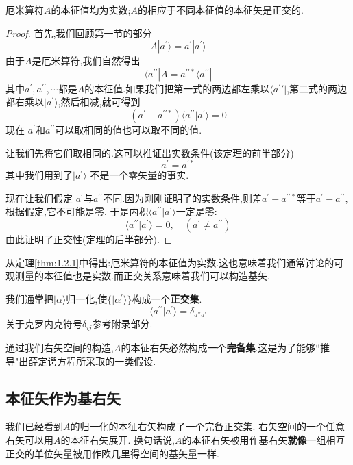 \documentclass[lang=cn,newtx,10pt,scheme=chinese,thmcnt=section]{elegantbook}
\begin{document}
\begin{theorem}\label{thm:1.2.1}
	厄米算符$A$的本征值均为实数;$A$的相应于不同本征值的本征矢是正交的.
\end{theorem}
\begin{proof}
	首先,我们回顾第一节的部分
	$$
	A|a^{\prime}\rangle=a^{\prime}| a^{\prime}\rangle
	$$
	由于$A$是厄米算符,我们自然得出
	$$
		\langle a^{\prime\prime}|A=a^{\prime\prime*}\langle a^{\prime\prime}|
	$$
	其中$a^\prime,a^{\prime\prime},\cdots$都是$A$的本征值.如果我们把第一式的两边都左乘以$\langle a^\prime\prime|$,第二式的两边都右乘以$|a^\prime\rangle$,然后相减,就可得到
	$$(a^{\prime}-a^{\prime\prime*})\langle a^{\prime\prime}|a^{\prime}\rangle=0$$
	现在 $a^{\prime}$和$a^{\prime\prime}$可以取相同的值也可以取不同的值.
	
	让我们先将它们取相同的.这可以推证出实数条件(该定理的前半部分)
	$$a^{\prime}=a^{\prime*}$$
	其中我们用到了$|a^\prime\rangle$ 不是一个零矢量的事实. 
	
	现在让我们假定 $a^\prime$与$a^{\prime\prime}$不同.因为刚刚证明了的实数条件,则差$a^{\prime}-a^{\prime\prime*}$等于$a^{\prime}-a^{\prime\prime}$,根据假定,它不可能是零. 于是内积$\langle a^{\prime\prime}|a^{\prime}\rangle$一定是零:
	$$\langle a^{\prime\prime}| a^{\prime}\rangle=0,\quad(a^{\prime}\neq a^{\prime\prime})$$
	由此证明了正交性(定理的后半部分).
\end{proof}
从定理\ref{thm:1.2.1}中得出:厄米算符的本征值为实数.这也意味着我们通常讨论的可观测量的本征值也是实数.而正交关系意味着我们可以构造基矢.

我们通常把$|\alpha\rangle$归一化,使$\{|\alpha^{'} \rangle\}$构成一个\textbf{正交集}.
\begin{equation}\label{eq1.2.1}
	\langle a^{\prime\prime}| a^{\prime}\rangle=\delta_{a^{\prime\prime}a^{\prime}}
\end{equation}
关于克罗内克符号$\delta_{ij}$参考附录部分.

通过我们右矢空间的构造,$A$的本征右矢必然构成一个\textbf{完备集}.这是为了能够``推导"出薛定谔方程所采取的一类假设.
\subsection*{本征矢作为基右矢}
我们已经看到$A$的归一化的本征右矢构成了一个完备正交集. 右矢空间的一个任意右矢可以用$A$的本征右矢展开. 换句话说,$A$的本征右矢被用作基右矢\textbf{就像}一组相互正交的单位矢量被用作欧几里得空间的基矢量一样.
\end{document}
